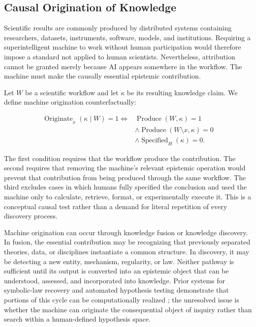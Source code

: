 \subsection{\textbf{Causal Origination of Knowledge}}

Scientific results are commonly produced by distributed systems containing
researchers, datasets, instruments, software, models, and institutions.
Requiring a superintelligent machine to work without human participation would
therefore impose a standard not applied to human scientists. Nevertheless,
attribution cannot be granted merely because AI appears somewhere in the
workflow. The machine must make the causally essential epistemic contribution.

Let $W$ be a scientific workflow and let $\kappa$ be its resulting knowledge
claim. We define machine origination counterfactually:

\begin{equation}
\begin{aligned}
\operatorname{Originate}_{x}(\kappa\mid W)=1
\Longleftrightarrow{}&
\operatorname{Produce}(W,\kappa)=1\\
&\land
\operatorname{Produce}(W\setminus x,\kappa)=0\\
&\land
\operatorname{Specified}_{H}(\kappa)=0.
\end{aligned}
\label{eq:causal_origination}
\end{equation}

The first condition requires that the workflow produce the contribution. The
second requires that removing the machine's relevant epistemic operation would
prevent that contribution from being produced through the same workflow. The
third excludes cases in which humans fully specified the conclusion and used
the machine only to calculate, retrieve, format, or experimentally execute it.
This is a conceptual causal test rather than a demand for literal repetition of
every discovery process.

Machine origination can occur through knowledge fusion or knowledge discovery.
In fusion, the essential contribution may be recognizing that previously
separated theories, data, or disciplines instantiate a common structure. In
discovery, it may be detecting a new entity, mechanism, regularity, or law.
Neither pathway is sufficient until its output is converted into an epistemic
object that can be understood, assessed, and incorporated into knowledge.
Prior systems for symbolic-law recovery and automated hypothesis testing
demonstrate that portions of this cycle can be computationally realized
\cite{schmidt2009laws,king2004robot}; the unresolved issue is whether the
machine can originate the consequential object of inquiry rather than search
within a human-defined hypothesis space.

